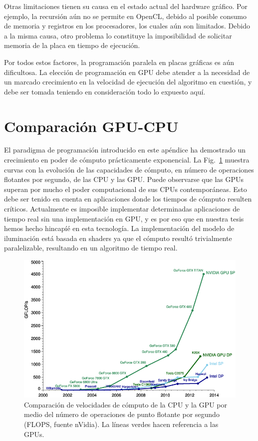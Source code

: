 Otras limitaciones tienen su causa en el estado actual del hardware gráfico.
Por ejemplo, la recursión aún no se permite en OpenCL, debido al posible consumo de memoria y registros en los procesadores, los cuales aún son limitados.
Debido a la misma causa, otro problema lo constituye la imposibilidad de solicitar memoria de la placa en tiempo de ejecución.

Por todos estos factores, la programación paralela en placas gráficas es aún dificultosa.
La elección de programación en GPU debe atender a la necesidad de un marcado crecimiento en la velocidad de ejecución del algoritmo en cuestión, y debe ser tomada teniendo en consideración todo lo expuesto aquí.

\section{Comparación GPU-CPU}
El paradigma de programación introducido en este apéndice ha demostrado un crecimiento en poder de cómputo prácticamente exponencial.
La Fig.~\ref{fg:cpugpu} muestra curvas con la evolución de las capacidades de cómputo, en número de operaciones flotantes por segundo, de las CPU y las GPU.
Puede observarse que las GPUs superan por mucho el poder computacional de sus CPUs contemporáneas.
Esto debe ser tenido en cuenta en aplicaciones donde los tiempos de cómputo resulten críticos.
Actualmente es imposible implementar determinadas aplicaciones de tiempo real sin una implementación en GPU, y es por eso que en nuestra tesis hemos hecho hincapíé en esta tecnología.
La implementación del modelo de iluminación está basada en shaders ya que el cómputo resultó trivialmente paralelizable, resultando en un algoritmo de tiempo real.

\begin{figure}[h]
\begin{center}
\includegraphics[width=12cm]{figures/cpugpu}
\end{center}
\caption[Comparación de velocidades de cómputo de la CPU y la GPU]{Comparación de velocidades de cómputo de la CPU y la GPU por medio del número de operaciones de punto flotante por segundo (FLOPS, fuente nVidia). La líneas verdes hacen referencia a las GPUs.}
\label{fg:cpugpu}
\end{figure}



